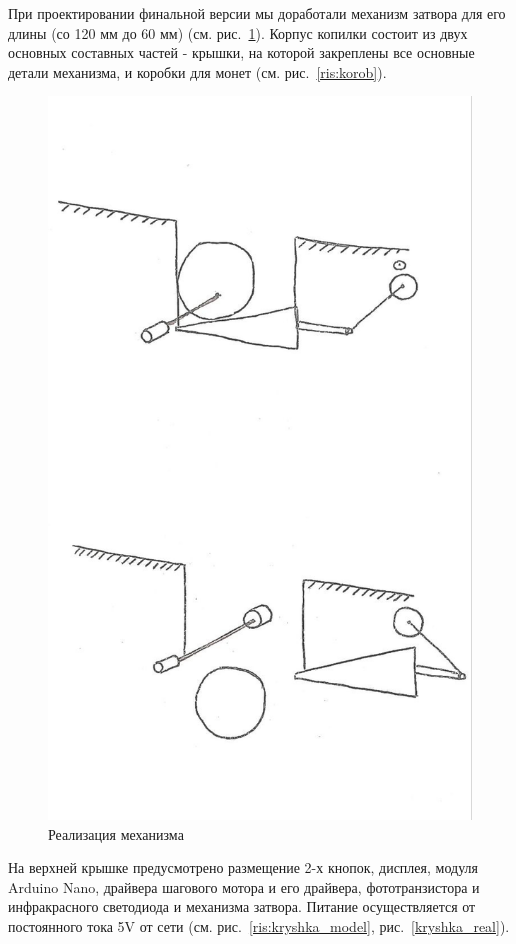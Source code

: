 При проектировании финальной версии мы доработали механизм затвора для его длины (со 120 мм до 60 мм) (см. рис.~\ref{ris:mechan}).
Корпус копилки состоит из двух основных составных частей - крышки, на которой закреплены все основные детали механизма, и коробки для монет (см. рис.~\ref{ris:korob}). 

\begin{figure}[H]
	\centering
	\includegraphics[width=12cm]{scheme_idea.jpg}
	\caption{Реализация механизма}
	\label{ris:mechan}
\end{figure}
\par\medskip

На верхней крышке предусмотрено размещение 2-х кнопок, дисплея, модуля Arduino Nano, драйвера шагового мотора и его драйвера, фототранзистора и инфракрасного светодиода и механизма затвора. Питание осуществляется от постоянного тока 5V от сети (см. рис.~\ref{ris:kryshka_model}, рис.~\ref{kryshka_real}).  

